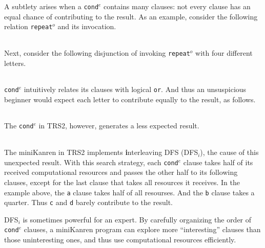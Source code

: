 \documentclass[format=acmlarge, review=false, authordraft=false]{acmart}
\newcommand{\conde}{\texttt{cond$^e$}}
\newcommand{\clisting}[1]{
\begin{center}
  \begin{tabular}{c}
	
    \end{tabular}
\end{center}
}
\newcommand{\repeato}{\texttt{repeat$^o$}}
\newcommand{\DFSi }[0]{DFS$_{i}$}
\begin{document}
A subtlety arises 
when a \conde{} contains many clauses: not every clause has an 
equal chance of contributing to the result. As an example, consider the 
following 
relation \repeato{} and its invocation. 

\clisting{Figures/repeato.rkt}

\noindent Next, consider the following disjunction of invoking \repeato{} with 
four different letters.

\clisting{Figures/example.rkt}

\noindent \conde{} intuitively relates its clauses with logical \texttt{or}. And 
thus an 
unsuspicious beginner would expect each letter to contribute equally to the 
result, as follows.

\clisting{Figures/run-repeato-fair.rkt}

\noindent The \conde{} in TRS2, however, generates a less expected result.

\clisting{Figures/run-repeato-idfs.rkt}

The miniKanren in TRS2 implements \textbf{i}nterleaving DFS (\DFSi), the cause of this 
unexpected result. With this search strategy, each \conde{} clause takes half 
of its received computational resources and passes the other half to its 
following clauses, except for the last clause that takes all resources it 
receives. In the example above, the \texttt{a} clause takes half of all 
resourses. And the \texttt{b} clause takes a quarter. Thus \texttt{c} and 
\texttt{d} barely contribute to the result.


\DFSi{} is sometimes powerful for an expert. By carefully organizing the order 
of \conde{} clauses, a miniKanren program can explore more ``interesting'' 
clauses than those uninteresting ones, and thus use computational resources 
efficiently.

\end{document}
